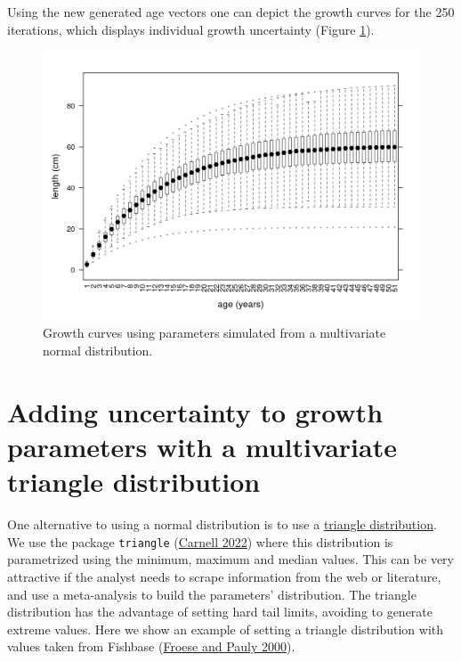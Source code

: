 \documentclass[
]{book}
\begin{document}
Using the new generated age vectors one can depict the growth curves for the 250 iterations, which displays individual growth uncertainty (Figure \ref{fig:plotmvgrowth}).

\begin{figure}
\centering
\includegraphics{_bookdown_files/_main_files/figure-html/plotmvgrowth-1.png}
\caption{\label{fig:plotmvgrowth}Growth curves using parameters simulated from a multivariate normal distribution.}
\end{figure}

\hypertarget{adding-uncertainty-to-growth-parameters-with-a-multivariate-triangle-distribution}{%
\section{Adding uncertainty to growth parameters with a multivariate triangle distribution}\label{adding-uncertainty-to-growth-parameters-with-a-multivariate-triangle-distribution}}

\label{sec:growth_triangle_cop}

One alternative to using a normal distribution is to use a \href{http://en.wikipedia.org/wiki/Triangle_distribution}{triangle distribution}. We use the package \texttt{triangle} (\protect\hyperlink{ref-R-triangle}{Carnell 2022}) where this distribution is parametrized using the minimum, maximum and median values. This can be very attractive if the analyst needs to scrape information from the web or literature, and use a meta-analysis to build the parameters' distribution. The triangle distribution has the advantage of setting hard tail limits, avoiding to generate extreme values. Here we show an example of setting a triangle distribution with values taken from Fishbase (\protect\hyperlink{ref-fishbase}{Froese and Pauly 2000}).
\end{document}

